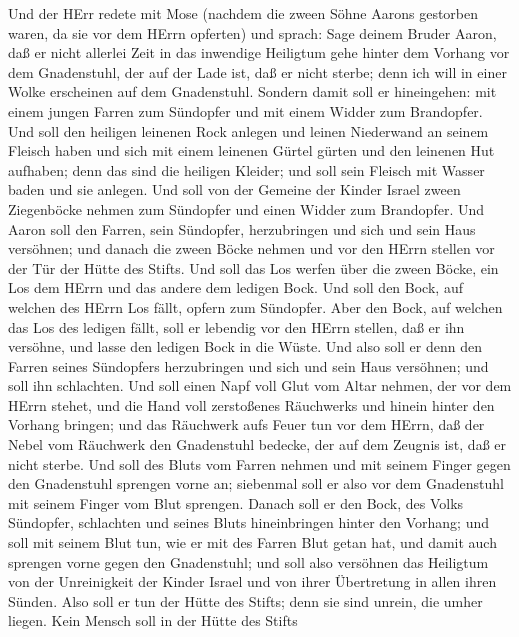  Und der HErr redete mit Mose (nachdem die zween Söhne
Aarons gestorben waren, da sie vor dem HErrn opferten)  und
sprach: Sage deinem Bruder Aaron, daß er nicht allerlei Zeit in das
inwendige Heiligtum gehe hinter dem Vorhang vor dem Gnadenstuhl, der auf
der Lade ist, daß er nicht sterbe; denn ich will in einer Wolke
erscheinen auf dem Gnadenstuhl.  Sondern damit soll er
hineingehen: mit einem jungen Farren zum Sündopfer und mit einem Widder
zum Brandopfer.  Und soll den heiligen leinenen Rock anlegen
und leinen Niederwand an seinem Fleisch haben und sich mit einem
leinenen Gürtel gürten und den leinenen Hut aufhaben; denn das sind die
heiligen Kleider; und soll sein Fleisch mit Wasser baden und sie
anlegen.  Und soll von der Gemeine der Kinder Israel zween
Ziegenböcke nehmen zum Sündopfer und einen Widder zum Brandopfer.
 Und Aaron soll den Farren, sein Sündopfer, herzubringen und
sich und sein Haus versöhnen;  und danach die zween Böcke
nehmen und vor den HErrn stellen vor der Tür der Hütte des Stifts.
 Und soll das Los werfen über die zween Böcke, ein Los dem
HErrn und das andere dem ledigen Bock.  Und soll den Bock,
auf welchen des HErrn Los fällt, opfern zum Sündopfer. 
Aber den Bock, auf welchen das Los des ledigen fällt, soll er lebendig
vor den HErrn stellen, daß er ihn versöhne, und lasse den ledigen Bock
in die Wüste.  Und also soll er denn den Farren seines
Sündopfers herzubringen und sich und sein Haus versöhnen; und soll ihn
schlachten.  Und soll einen Napf voll Glut vom Altar
nehmen, der vor dem HErrn stehet, und die Hand voll zerstoßenes
Räuchwerks und hinein hinter den Vorhang bringen;  und das
Räuchwerk aufs Feuer tun vor dem HErrn, daß der Nebel vom Räuchwerk den
Gnadenstuhl bedecke, der auf dem Zeugnis ist, daß er nicht sterbe.
 Und soll des Bluts vom Farren nehmen und mit seinem Finger
gegen den Gnadenstuhl sprengen vorne an; siebenmal soll er also vor dem
Gnadenstuhl mit seinem Finger vom Blut sprengen.  Danach
soll er den Bock, des Volks Sündopfer, schlachten und seines Bluts
hineinbringen hinter den Vorhang; und soll mit seinem Blut tun, wie er
mit des Farren Blut getan hat, und damit auch sprengen vorne gegen den
Gnadenstuhl;  und soll also versöhnen das Heiligtum von der
Unreinigkeit der Kinder Israel und von ihrer Übertretung in allen ihren
Sünden. Also soll er tun der Hütte des Stifts; denn sie sind unrein, die
umher liegen.  Kein Mensch soll in der Hütte des Stifts
